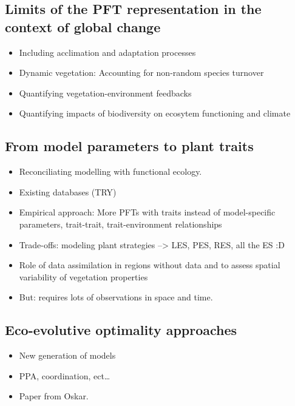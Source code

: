 \documentclass[12pt,oneside]{book}
\providecommand{\tightlist}{%
  \setlength{\itemsep}{0pt}\setlength{\parskip}{0pt}}
\begin{document}
\subsection{Limits of the PFT representation in the context of global
change}\label{limits-of-the-pft-representation-in-the-context-of-global-change}

\begin{itemize}
\tightlist
\item
  Including acclimation and adaptation processes
\item
  Dynamic vegetation: Accounting for non-random species turnover
\item
  Quantifying vegetation-environment feedbacks
\item
  Quantifying impacts of biodiversity on ecosytem functioning and
  climate
\end{itemize}

\subsection{From model parameters to plant
traits}\label{from-model-parameters-to-plant-traits}

\begin{itemize}
\tightlist
\item
  Reconciliating modelling with functional ecology.
\item
  Existing databases (TRY)
\item
  Empirical approach: More PFTs with traits instead of model-specific
  parameters, trait-trait, trait-environment relationships
\item
  Trade-offs: modeling plant strategies --\textgreater{} LES, PES, RES,
  all the ES :D
\item
  Role of data assimilation in regions without data and to assess
  spatial variability of vegetation properties
\item
  But: requires lots of observations in space and time.
\end{itemize}

\subsection{Eco-evolutive optimality
approaches}\label{eco-evolutive-optimality-approaches}

\begin{itemize}
\tightlist
\item
  New generation of models
\item
  PPA, coordination, ect\ldots{}
\item
  Paper from Oskar.
\end{itemize}
\end{document}
